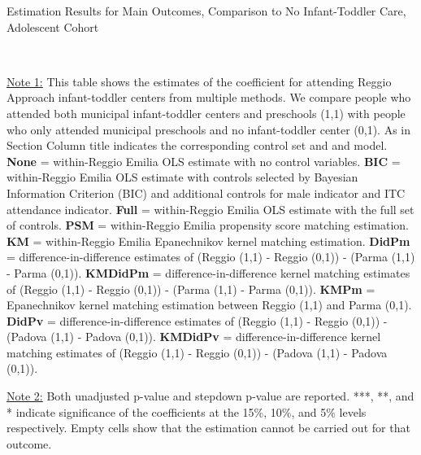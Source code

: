 \begin{table}[H] \caption{Estimation Results for Main Outcomes, Comparison to No Infant-Toddler Care, Adolescent Cohort} \label{ols-M-adol-reg-nopres-asilo}
\scalebox{0.62}{}
\vspace{1ex} \\
\footnotesize\raggedright{\underline{Note 1:} This table shows the estimates of the coefficient for attending Reggio Approach infant-toddler centers from multiple methods. We compare people who attended both municipal infant-toddler centers and preschools (1,1) with people who only attended municipal preschools and no infant-toddler center (0,1). As in Section Column title indicates the corresponding control set and and model.  \textbf{None} = within-Reggio Emilia OLS estimate with no control variables. \textbf{BIC} = within-Reggio Emilia OLS estimate with controls selected by Bayesian Information Criterion (BIC) and additional controls for male indicator and ITC attendance indicator. \textbf{Full} = within-Reggio Emilia OLS estimate with the full set of controls. \textbf{PSM} =  within-Reggio Emilia propensity score matching estimation. \textbf{KM} =  within-Reggio Emilia Epanechnikov kernel matching estimation. \textbf{DidPm} = difference-in-difference estimates of (Reggio (1,1) - Reggio (0,1)) - (Parma (1,1) - Parma (0,1)).  \textbf{KMDidPm} = difference-in-difference kernel matching estimates of (Reggio (1,1) - Reggio (0,1)) - (Parma (1,1) - Parma (0,1)).  \textbf{KMPm} =  Epanechnikov kernel matching estimation between Reggio (1,1) and Parma (0,1).   \textbf{DidPv} = difference-in-difference estimates of (Reggio (1,1) - Reggio (0,1)) - (Padova (1,1) - Padova (0,1)). \textbf{KMDidPv} = difference-in-difference kernel matching estimates of (Reggio (1,1) - Reggio (0,1)) - (Padova (1,1) - Padova (0,1)). }

\footnotesize\raggedright{\underline{Note 2:} Both unadjusted p-value and stepdown p-value are reported. ***, **, and * indicate significance of the coefficients at the 15\%, 10\%, and 5\% levels respectively. Empty cells show that the estimation cannot be carried out for that outcome.}
\end{table}

